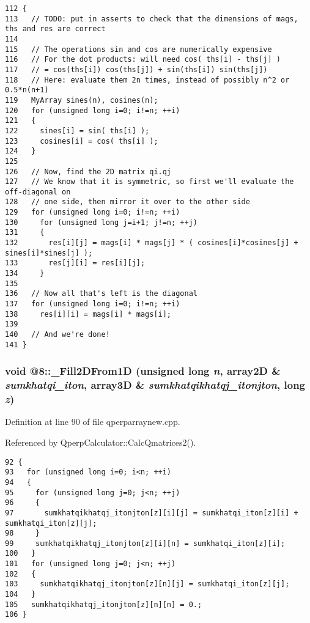 \begin{Code}\begin{verbatim}112 {
113   // TODO: put in asserts to check that the dimensions of mags, ths and res are correct
114 
115   // The operations sin and cos are numerically expensive
116   // For the dot products: will need cos( ths[i] - ths[j] )
117   // = cos(ths[i]) cos(ths[j]) + sin(ths[i]) sin(ths[j])
118   // Here: evaluate them 2n times, instead of possibly n^2 or 0.5*n(n+1)
119   MyArray sines(n), cosines(n);
120   for (unsigned long i=0; i!=n; ++i)
121   {
122     sines[i] = sin( ths[i] );
123     cosines[i] = cos( ths[i] );
124   }
125 
126   // Now, find the 2D matrix qi.qj
127   // We know that it is symmetric, so first we'll evaluate the off-diagonal on
128   // one side, then mirror it over to the other side
129   for (unsigned long i=0; i!=n; ++i)
130     for (unsigned long j=i+1; j!=n; ++j)
131     {
132       res[i][j] = mags[i] * mags[j] * ( cosines[i]*cosines[j] + sines[i]*sines[j] );
133       res[j][i] = res[i][j];
134     }
135 
136   // Now all that's left is the diagonal
137   for (unsigned long i=0; i!=n; ++i)
138     res[i][i] = mags[i] * mags[i];
139 
140   // And we're done!
141 }
\end{verbatim}
\end{Code}


\subsubsection{\setlength{\rightskip}{0pt plus 5cm}void @8::\_\-Fill2DFrom1D (unsigned long {\em n}, array2D \& {\em sumkhatqi\_\-iton}, array3D \& {\em sumkhatqikhatqj\_\-itonjton}, long {\em z})\hspace{0.3cm}{\tt  [static]}}\label{qperparraynew_8cpp_d834a8fc7dd96237188220f0ed214a38}




Definition at line 90 of file qperparraynew.cpp.

Referenced by QperpCalculator::CalcQmatrices2().

\begin{Code}\begin{verbatim}92 {
93   for (unsigned long i=0; i<n; ++i)
94   {
95     for (unsigned long j=0; j<n; ++j)
96     {
97       sumkhatqikhatqj_itonjton[z][i][j] = sumkhatqi_iton[z][i] + sumkhatqi_iton[z][j];
98     }
99     sumkhatqikhatqj_itonjton[z][i][n] = sumkhatqi_iton[z][i];
100   }
101   for (unsigned long j=0; j<n; ++j)
102   {
103     sumkhatqikhatqj_itonjton[z][n][j] = sumkhatqi_iton[z][j];
104   }
105   sumkhatqikhatqj_itonjton[z][n][n] = 0.;
106 }
\end{verbatim}
\end{Code}


